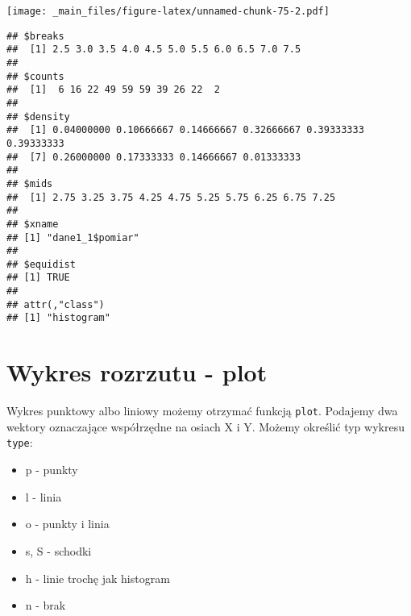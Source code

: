 \documentclass[
]{book}
\newenvironment{Shaded}{\begin{snugshade}}{\end{snugshade}}
\newcommand{\AttributeTok}[1]{\textcolor[rgb]{0.77,0.63,0.00}{#1}}
\newcommand{\CommentTok}[1]{\textcolor[rgb]{0.56,0.35,0.01}{\textit{#1}}}
\newcommand{\ConstantTok}[1]{\textcolor[rgb]{0.00,0.00,0.00}{#1}}
\newcommand{\DecValTok}[1]{\textcolor[rgb]{0.00,0.00,0.81}{#1}}
\newcommand{\FunctionTok}[1]{\textcolor[rgb]{0.00,0.00,0.00}{#1}}
\newcommand{\NormalTok}[1]{#1}
\newcommand{\SpecialCharTok}[1]{\textcolor[rgb]{0.00,0.00,0.00}{#1}}
\newcommand{\StringTok}[1]{\textcolor[rgb]{0.31,0.60,0.02}{#1}}
\begin{document}
\begin{Shaded}
\end{Shaded}

\texttt{[image: \_main\_files/figure-latex/unnamed-chunk-75-2.pdf]}

\begin{Shaded}
\end{Shaded}

\begin{verbatim}
## $breaks
##  [1] 2.5 3.0 3.5 4.0 4.5 5.0 5.5 6.0 6.5 7.0 7.5
## 
## $counts
##  [1]  6 16 22 49 59 59 39 26 22  2
## 
## $density
##  [1] 0.04000000 0.10666667 0.14666667 0.32666667 0.39333333 0.39333333
##  [7] 0.26000000 0.17333333 0.14666667 0.01333333
## 
## $mids
##  [1] 2.75 3.25 3.75 4.25 4.75 5.25 5.75 6.25 6.75 7.25
## 
## $xname
## [1] "dane1_1$pomiar"
## 
## $equidist
## [1] TRUE
## 
## attr(,"class")
## [1] "histogram"
\end{verbatim}

\hypertarget{wykres-rozrzutu---plot}{%
\section{Wykres rozrzutu - plot}\label{wykres-rozrzutu---plot}}

Wykres punktowy albo liniowy możemy otrzymać funkcją \texttt{plot}. Podajemy dwa wektory oznaczające współrzędne na osiach X i Y. Możemy określić typ wykresu \texttt{type}:

\begin{itemize}
\item
  p - punkty
\item
  l - linia
\item
  o - punkty i linia
\item
  s, S - schodki
\item
  h - linie trochę jak histogram
\item
  n - brak
\end{itemize}
\end{document}
